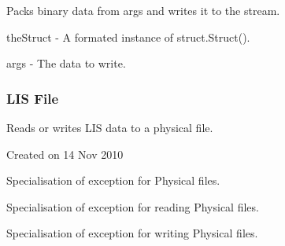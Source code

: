 \documentclass[letterpaper,10pt,english]{sphinxmanual}
\begin{document}
\begin{fulllineitems}

\begin{fulllineitems}
\label{\detokenize{ref/LIS/core/RawStream:TotalDepth.LIS.core.RawStream.RawStream.packAndWrite}}
Packs binary data from args and writes it to the stream.

theStruct - A formated instance of struct.Struct().

args - The data to write.

\end{fulllineitems}


\end{fulllineitems}



\subsubsection{LIS File}
\label{\detokenize{ref/LIS/core/File:lis-file}}\label{\detokenize{ref/LIS/core/File::doc}}\label{\detokenize{ref/LIS/core/File:module-TotalDepth.LIS.core.File}}
Reads or writes LIS data to a physical file.

Created on 14 Nov 2010

\begin{fulllineitems}
\label{\detokenize{ref/LIS/core/File:TotalDepth.LIS.core.File.ExceptionFile}}
Specialisation of exception for Physical files.

\end{fulllineitems}


\begin{fulllineitems}
\label{\detokenize{ref/LIS/core/File:TotalDepth.LIS.core.File.ExceptionFileRead}}
Specialisation of exception for reading Physical files.

\end{fulllineitems}


\begin{fulllineitems}
\label{\detokenize{ref/LIS/core/File:TotalDepth.LIS.core.File.ExceptionFileWrite}}
Specialisation of exception for writing Physical files.

\end{fulllineitems}
\end{document}
